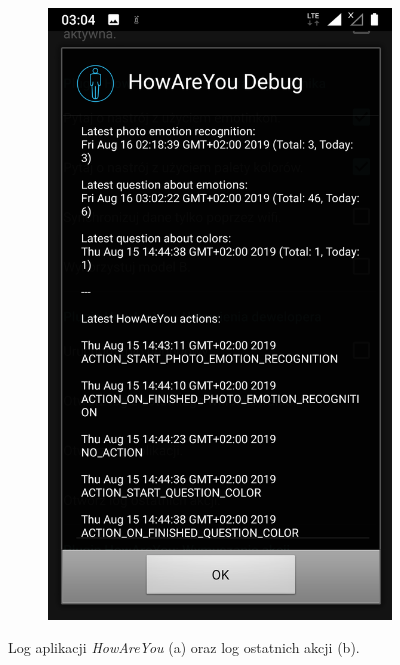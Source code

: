 \begin{figure}[H]
\begin{subfigure}{0.35\textwidth}
	\subcaption{\label{subfigure_a}}
\end{subfigure}
\begin{subfigure}{0.35\textwidth}
	\centering
	\includegraphics[scale=0.13]{rozdzial3/Ustawienia_logOstatnichAkcji.png}
	\subcaption{\label{subfigure_b}}
\end{subfigure}
\caption{ Log aplikacji \textit{HowAreYou} (a) oraz log ostatnich akcji (b).}
\end{figure}



